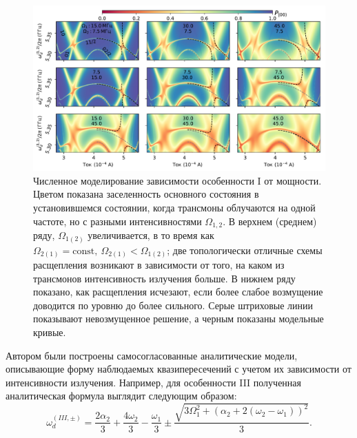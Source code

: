 \documentclass[14pt, a4paper]{extarticle}
\begin{document}
\begin{figure}[t]
	\includegraphics[width=1\linewidth]{Pictures/topological_splittings}
	\caption{Численное моделирование зависимости особенности I от мощности. Цветом показана заселенность основного состояния в установившемся состоянии, когда трансмоны облучаются на одной частоте, но с разными интенсивностями $\Omega_{1,2}$. В верхнем (среднем) ряду, 
		$\Omega_{1(2)}$ увеличивается, в то время как
		$\Omega_{2(1)} = \text{const},\ \Omega_{2(1)} < 
		\Omega_{1(2)}$; две топологически отличные схемы расщепления возникают в зависимости от того, на каком из трансмонов интенсивность излучения больше. В нижнем ряду показано, как расщепления исчезают, если более слабое возмущение доводится по уровню до более сильного. Серые штриховые линии показывают невозмущенное решение, а черным показаны модельные кривые.}
	\label{fig:topologicalsplittings}
\end{figure}

Автором были построены самосогласованные аналитические модели, описывающие форму наблюдаемых квазипересечений с учетом их зависимости от интенсивности излучения. Например, для особенности III полученная аналитическая формула выглядит следующим образом:
\begin{equation}
\omega_d^{(III, \pm)} = \frac{2 \alpha_2}{3} + \frac{4 \omega_{2}}{3} - \frac{\omega_{1}}{3} \pm \frac{\sqrt{3 \Omega_{1}^{2} + \left( \alpha_2 + 2 (\omega_{2} - \omega_{1})\right)^{2}}}{3}.
\label{eq:splitting_model}
\end{equation}
\end{document}

